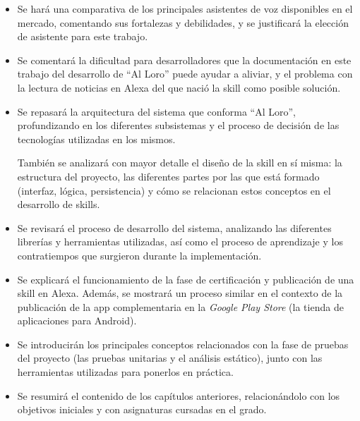 \documentclass[11pt,spanish,listoffigures,listoftables,table,hyphens,dvipsnames]{tfgetsinf}
\begin{document}
\begin{itemize}
   \item \textbf{}

      Se hará una comparativa de los principales asistentes de voz disponibles en el mercado, comentando sus fortalezas y debilidades, y se justificará la elección de asistente para este trabajo.
   \item \textbf{}

      Se comentará la dificultad para desarrolladores que la documentación en este trabajo del desarrollo de ``Al Loro'' puede ayudar a aliviar, y el problema con la lectura de noticias en Alexa del que nació la skill como posible solución.
   \item \textbf{}
      
      Se repasará la arquitectura del sistema que conforma ``Al Loro'', profundizando en los diferentes subsistemas y el proceso de decisión de las tecnologías utilizadas en los mismos.
      
      También se analizará con mayor detalle el diseño de la skill en sí misma: la estructura del proyecto, las diferentes partes por las que está formado (interfaz, lógica, persistencia) y cómo se relacionan estos conceptos en el desarrollo de skills.
   \item \textbf{}
   
      Se revisará el proceso de desarrollo del sistema, analizando las diferentes librerías y herramientas utilizadas, así como el proceso de aprendizaje y los contratiempos que surgieron durante la implementación.
   \item \textbf{}
   
      Se explicará el funcionamiento de la fase de certificación y publicación de una skill en Alexa. Además, se mostrará un proceso similar en el contexto de la publicación de la app complementaria en la \emph{Google Play Store} (la tienda de aplicaciones para Android).
   \item \textbf{}

      Se introducirán los principales conceptos relacionados con la fase de pruebas del proyecto (las pruebas unitarias y el análisis estático), junto con las herramientas utilizadas para ponerlos en práctica.
   \item \textbf{}
   
      Se resumirá el contenido de los capítulos anteriores, relacionándolo con los objetivos iniciales y con asignaturas cursadas en el grado.

\end{itemize}
\end{document}
